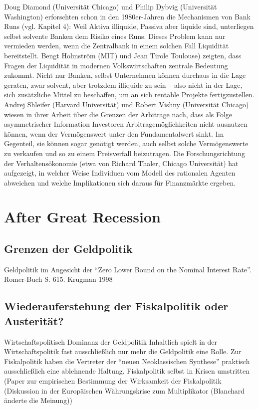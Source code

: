 Doug
Diamond (Universität Chicago) und Philip Dybvig (Universität Washington) erforschten
schon in den 1980er-Jahren die Mechanismen von Bank Runs (vgl. Kapitel 4): Weil
Aktiva illiquide, Passiva aber liquide sind, unterliegen selbst solvente Banken dem
Risiko eines Runs. Dieses Problem kann nur vermieden werden, wenn die Zentralbank
in einem solchen Fall Liquidität bereitstellt. Bengt Holmström (MIT) und Jean Tirole
Toulouse) zeigten, dass Fragen der Liquidität in modernen Volkswirtschaften zentrale
Bedeutung zukommt. Nicht nur Banken, selbst Unternehmen können durchaus in die
Lage geraten, zwar solvent, aber trotzdem illiquide zu sein – also nicht in der Lage, sich
zusätzliche Mittel zu beschaffen, um an sich rentable Projekte fertigzustellen. Andrej
Shleifer (Harvard Universität) und Robert Vishny (Universität Chicago) wiesen in ihrer
Arbeit über die Grenzen der Arbitrage nach, dass als Folge asymmetrischer Information
Investoren Arbitragemöglichkeiten nicht ausnutzen können, wenn der Vermögenswert
unter den Fundamentalwert sinkt. Im Gegenteil, sie können sogar genötigt werden, auch
selbst solche Vermögenswerte zu verkaufen und so zu einem Preisverfall beizutragen.
Die Forschungsrichtung der Verhaltensökonomie (etwa von Richard Thaler, Chicago
Universität) hat aufgezeigt, in welcher Weise Individuen vom Modell des rationalen
Agenten abweichen und welche Implikationen sich daraus für Finanzmärkte ergeben.





\section{After Great Recession}

\subsection{Grenzen der Geldpolitik}
Geldpolitik im Angesicht der "`Zero Lower Bound on the Nominal Interest Rate"'. Romer-Buch S. 615.
Krugman 1998




\subsection{Wiederauferstehung der Fiskalpolitik oder Austerität?}



Wirtschaftspolitisch Dominanz der Geldpolitik
Inhaltlich spielt in der Wirtschaftspolitik fast ausschließlich nur mehr die Geldpolitik eine Rolle. Zur Fiskalpolitik haben die Vertreter der "`neuen Neoklassischen Synthese"' praktisch ausschließlich eine ablehnende Haltung.
Fiskalpolitik selbst in Krisen umstritten (Paper zur empirischen Bestimmung der Wirksamkeit der Fiskalpolitik (Diskussion in der Europäischen Währungskrise zum Multiplikator (Blanchard änderte die Meinung))


